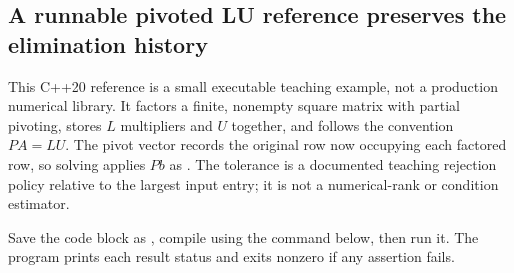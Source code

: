 \subsection{A runnable pivoted LU reference preserves the elimination history}\label{01-foundations-i-ch019-a-runnable-pivoted-lu-reference-preserves-the-elimination-history}

\hypertarget{01-foundations-i-ch019-a-runnable-pivoted-lu-reference-preserves-the-elimination-history}{}

This C++20 reference is a small executable teaching example, not a production numerical library. It factors a finite, nonempty square matrix with partial pivoting, stores \(L\) multipliers and \(U\) together, and follows the convention \(PA=LU\). The pivot vector records the original row now occupying each factored row, so solving applies \(Pb\) as . The tolerance is a documented teaching rejection policy relative to the largest input entry; it is not a numerical-rank or condition estimator.

Save the code block as , compile using the command below, then run it. The program prints each result status and exits nonzero if any assertion fails.

